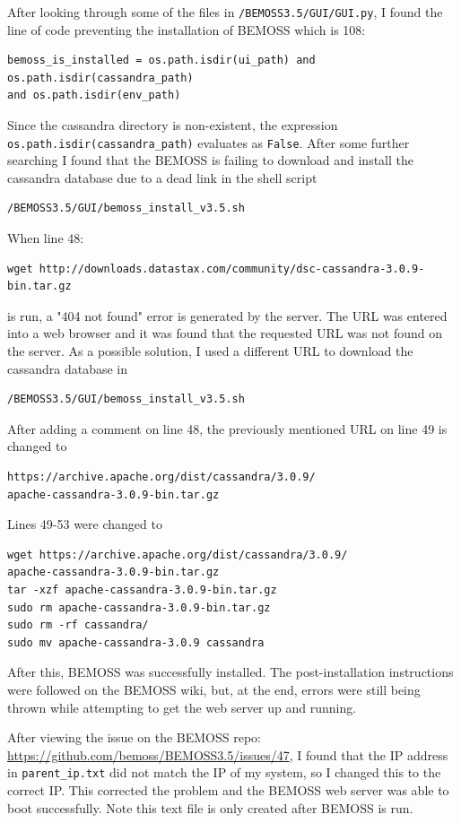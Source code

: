 \documentclass[fontsize=11pt, %
                             paper=letter, %
                             twoside, %
                             captions=tableheading,
                             index=totoc,
                             hyperref]{labbook}
\begin{document}
\begin{addmargin}[0cm]{0cm}
After looking through some of the files in \texttt{/BEMOSS3.5/GUI/GUI.py}, I found the line of code preventing the installation of BEMOSS which is 108:
\begin{verbatim}
bemoss_is_installed = os.path.isdir(ui_path) and os.path.isdir(cassandra_path) 
and os.path.isdir(env_path)
\end{verbatim}
Since the cassandra directory is non-existent, the expression \texttt{os.path.isdir(cassandra\_path)} evaluates as \texttt{False}.
\bigbreak\noindent
After some further searching I found that the BEMOSS is failing to download and install the cassandra database due to a dead link in the shell script
\begin{verbatim}
/BEMOSS3.5/GUI/bemoss_install_v3.5.sh
\end{verbatim} 
When line 48:
\begin{verbatim}
wget http://downloads.datastax.com/community/dsc-cassandra-3.0.9-bin.tar.gz
\end{verbatim} is run, a "404 not found" error is generated by the server. The URL was entered into a web browser and it was found that the requested URL was not found on the server.
\bigbreak\noindent
As a possible solution, I used a different URL to download the cassandra database in
\begin{verbatim}
/BEMOSS3.5/GUI/bemoss_install_v3.5.sh
\end{verbatim}
After adding a comment on line 48, the previously mentioned URL on line 49 is changed to
\begin{verbatim}
https://archive.apache.org/dist/cassandra/3.0.9/
apache-cassandra-3.0.9-bin.tar.gz
\end{verbatim}
Lines 49-53 were changed to
\begin{verbatim}
wget https://archive.apache.org/dist/cassandra/3.0.9/
apache-cassandra-3.0.9-bin.tar.gz
tar -xzf apache-cassandra-3.0.9-bin.tar.gz
sudo rm apache-cassandra-3.0.9-bin.tar.gz
sudo rm -rf cassandra/
sudo mv apache-cassandra-3.0.9 cassandra
\end{verbatim}  
After this, BEMOSS was successfully installed.
The post-installation instructions were followed on the BEMOSS wiki, but, at the end, errors were still being thrown while attempting to get the web server up and running.

After viewing the issue on the BEMOSS repo:
\url{https://github.com/bemoss/BEMOSS3.5/issues/47}, I found that the IP address in \texttt{parent\_ip.txt} did not match the IP of my system, so I changed this to the correct IP. This corrected the problem and the BEMOSS web server was able to boot successfully. Note this text file is only created after BEMOSS is run.
\end{addmargin}
\end{document}
